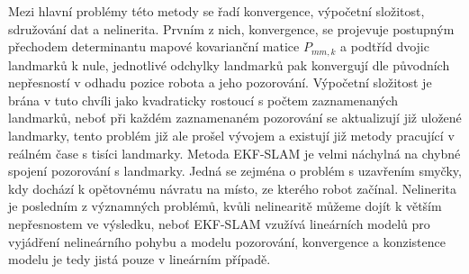 \documentclass[11pt]{article}
\begin{document}
Mezi hlavní problémy této metody se řadí konvergence, výpočetní složitost, sdružování dat a nelinerita. Prvním z nich, konvergence, se projevuje postupným přechodem determinantu mapové kovarianční matice $P_{mm,k}$ a podtříd dvojic landmarků k nule, jednotlivé odchylky landmarků pak konvergují dle původních nepřesností v odhadu pozice robota a jeho pozorování. Výpočetní složitost je brána v tuto chvíli jako kvadraticky rostoucí s počtem zaznamenaných landmarků, neboť při každém zaznamenaném pozorování se aktualizují již uložené landmarky, tento problém již ale prošel vývojem a existují již metody pracující v reálném čase s tisíci landmarky. Metoda EKF-SLAM je velmi náchylná na chybné spojení pozorování s landmarky. Jedná se zejména o problém s uzavřením smyčky, kdy dochází k opětovnému návratu na místo, ze kterého robot začínal. Nelinerita je posledním z významných problémů, kvůli nelinearitě můžeme dojít k větším nepřesnostem ve výsledku, neboť EKF-SLAM vzužívá lineárních modelů pro vyjádření nelineárního pohybu a modelu pozorování, konvergence a konzistence modelu je tedy jistá pouze v lineárním případě. 
\end{document}
